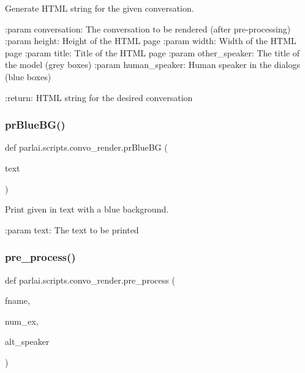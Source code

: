 \begin{DoxyVerb}Generate HTML string for the given conversation.

:param conversation:
    The conversation to be rendered (after pre-processing)
:param height:
    Height of the HTML page
:param width:
    Width of the HTML page
:param title:
    Title of the HTML page
:param other_speaker:
    The title of the model (grey boxes)
:param human_speaker:
    Human speaker in the dialogs (blue boxes)

:return: HTML string for the desired conversation
\end{DoxyVerb}
 \mbox{\label{namespaceparlai_1_1scripts_1_1convo__render_a21a7681b9803eb6994ac72c7d480cb94}} 
\subsubsection{\texorpdfstring{pr\+Blue\+B\+G()}{prBlueBG()}}
{\footnotesize\ttfamily def parlai.\+scripts.\+convo\+\_\+render.\+pr\+Blue\+BG (\begin{DoxyParamCaption}\item[{}]{text }\end{DoxyParamCaption})}

\begin{DoxyVerb}Print given in text with a blue background.

:param text: The text to be printed
\end{DoxyVerb}
 \mbox{\label{namespaceparlai_1_1scripts_1_1convo__render_a0f0a031443ca797c936d2961a702a45e}} 
\subsubsection{\texorpdfstring{pre\+\_\+process()}{pre\_process()}}
{\footnotesize\ttfamily def parlai.\+scripts.\+convo\+\_\+render.\+pre\+\_\+process (\begin{DoxyParamCaption}\item[{}]{fname,  }\item[{}]{num\+\_\+ex,  }\item[{}]{alt\+\_\+speaker }\end{DoxyParamCaption})}

